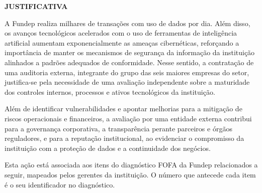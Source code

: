 \documentclass[12pt,a4paper]{article}
\newcommand{\secao}[1]{%
  \par\vspace{\dimexpr16pt-\parskip\relax}%
  {\noindent\bfseries\color{azulTitulo}\fontsize{13}{16}\selectfont #1}%
  \par\vspace{\dimexpr8pt-\parskip\relax}%
}
\begin{document}
%
%
%
%
\secao{JUSTIFICATIVA}

A Fundep realiza milhares de transações com uso de dados por dia. Além disso, os avanços tecnológicos acelerados com o uso de ferramentas de inteligência artificial aumentam exponencialmente as ameaças cibernéticas, reforçando a importância de manter os mecanismos de segurança da informação da instituição alinhados a padrões adequados de conformidade. Nesse sentido, a contratação de uma auditoria externa, integrante do grupo das seis maiores empresas do setor, justifica-se pela necessidade de uma avaliação independente sobre a maturidade dos controles internos, processos e ativos tecnológicos da instituição.

Além de identificar vulnerabilidades e apontar melhorias para a mitigação de riscos operacionais e financeiros, a avaliação por uma entidade externa contribui para a governança corporativa, a transparência perante parceiros e órgãos reguladores, e para a reputação institucional, ao evidenciar o compromisso da instituição com a proteção de dados e a continuidade dos negócios.

Esta ação está associada aos itens do diagnóstico FOFA da Fundep relacionados a seguir, mapeados pelos gerentes da instituição. O número que antecede cada item é o seu identificador no diagnóstico.
\end{document}
